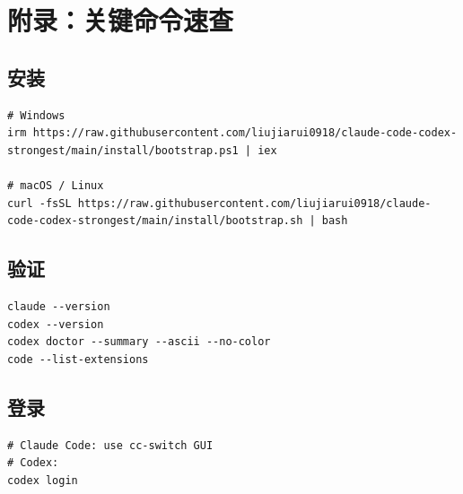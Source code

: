 \documentclass[11pt,a4paper]{ctexbook}
\begin{document}
\chapter{附录：关键命令速查}

\section{安装}

\begin{lstlisting}[language={}]
# Windows
irm https://raw.githubusercontent.com/liujiarui0918/claude-code-codex-strongest/main/install/bootstrap.ps1 | iex

# macOS / Linux
curl -fsSL https://raw.githubusercontent.com/liujiarui0918/claude-code-codex-strongest/main/install/bootstrap.sh | bash
\end{lstlisting}

\section{验证}

\begin{lstlisting}[language={}]
claude --version
codex --version
codex doctor --summary --ascii --no-color
code --list-extensions
\end{lstlisting}

\section{登录}

\begin{lstlisting}[language={}]
# Claude Code: use cc-switch GUI
# Codex:
codex login
\end{lstlisting}

\backmatter
\printindex
\end{document}

